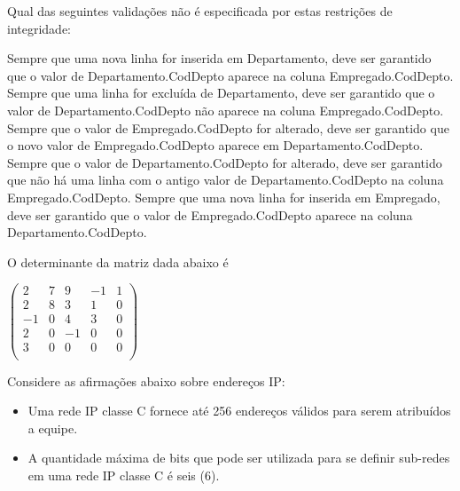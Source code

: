\documentclass[12pt, addpoints]{exam}
\begin{document}
\begin{questions}
Qual das seguintes validações não é especificada por estas restrições de integridade:
\begin{choices}
\choice Sempre que uma nova linha for inserida em Departamento, deve ser garantido que o valor de Departamento.CodDepto aparece na coluna Empregado.CodDepto.
\choice Sempre que uma linha for excluída de Departamento, deve ser garantido que o valor de Departamento.CodDepto não aparece na coluna Empregado.CodDepto.
\choice Sempre que o valor de Empregado.CodDepto for alterado, deve ser garantido que o novo valor de Empregado.CodDepto aparece em Departamento.CodDepto.
\choice Sempre que o valor de Departamento.CodDepto for alterado, deve ser garantido que não há uma linha com o antigo valor de Departamento.CodDepto na coluna Empregado.CodDepto.
\choice Sempre que uma nova linha for inserida em Empregado, deve ser garantido que o valor de Empregado.CodDepto aparece na coluna Departamento.CodDepto.
\end{choices}

\question

O determinante da matriz dada abaixo é

$\begin{pmatrix}

2 & 7 & 9 & -1 & 1 \\

2 & 8 & 3 & 1 & 0 \\

-1 & 0 & 4 & 3 & 0 \\

2 & 0 & -1 & 0 & 0 \\

3 & 0 & 0 & 0 & 0 \\

\end{pmatrix}$
\begin{choices}
\end{choices}

\question

Considere as afirmações abaixo sobre endereços IP:

\begin{itemize}

    \item[I.] Uma rede IP classe C fornece até 256 endereços válidos para serem atribuídos a equipe.

    \item[II.] A quantidade máxima de bits que pode ser utilizada para se definir sub-redes em uma rede IP classe C é seis (6).


\end{itemize}
\end{questions}
\end{document}
